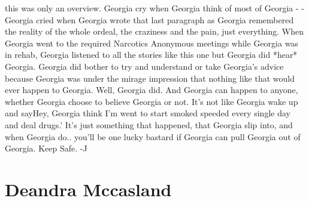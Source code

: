 \documentclass[12pt]{book}
\begin{document}
this was only an overview. Georgia cry when Georgia think of most of Georgia - - Georgia cried when Georgia wrote that last paragraph as Georgia remembered the reality of the whole ordeal, the craziness and the pain, just everything. When Georgia went to the required Narcotics Anonymous meetings while Georgia was in rehab, Georgia listened to all the stories like this one but Georgia did *hear* Georgia. Georgia did bother to try and understand or take Georgia's advice because Georgia was under the mirage impression that nothing like that would ever happen to Georgia. Well, Georgia did. And Georgia can happen to anyone, whether Georgia choose to believe Georgia or not. It's not like Georgia wake up and sayHey, Georgia think I'm went to start smoked speeded every single day and deal drugs.' It's just something that happened, that Georgia slip into, and when Georgia do.. you'll be one lucky bastard if Georgia can pull Georgia out of Georgia. Keep Safe. -J



\chapter{Deandra Mccasland}
\end{document}
